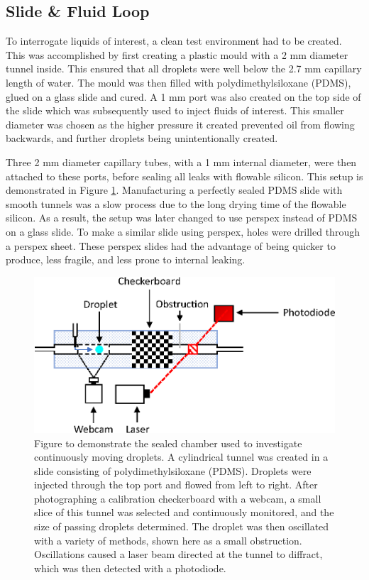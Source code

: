 \documentclass{physics_article_B}
\begin{document}
    \subsection{Slide \& Fluid Loop\label{sect:method:slide}}
    
        To interrogate liquids of interest, a clean test environment had to be created. This was accomplished by first creating a plastic mould with a 2 mm diameter tunnel inside. This ensured that all droplets were well below the 2.7 mm capillary length of water\cite{capillary}. The mould was then filled with polydimethylsiloxane (PDMS), glued on a glass slide and cured. A 1 mm port was also created on the top side of the slide which was subsequently used to inject fluids of interest. This smaller diameter was chosen as the higher pressure it created prevented oil from flowing backwards, and further droplets being unintentionally created.
        
        Three 2 mm diameter capillary tubes, with a 1 mm internal diameter, were then attached to these ports, before sealing all leaks with flowable silicon. This setup is demonstrated in Figure \ref{fig:slide}. Manufacturing a perfectly sealed PDMS slide with smooth tunnels was a slow process due to the long drying time of the flowable silicon. As a result, the setup was later changed to use perspex instead of PDMS on a glass slide. To make a similar slide using perspex, holes were drilled through a perspex sheet. These perspex slides had the advantage of being quicker to produce, less fragile, and less prone to internal leaking. 
        
            \begin{figure}[H]
                \centering
                    \hspace*{2.4cm}\includegraphics[scale=0.9]{Figures/Control.eps}
                    \caption{Figure to demonstrate the sealed chamber used to investigate continuously moving droplets. A cylindrical tunnel was created in a slide consisting of polydimethylsiloxane (PDMS). Droplets were injected through the top port and flowed from left to right. After photographing a calibration checkerboard with a webcam, a small slice of this tunnel was selected and continuously monitored, and the size of passing droplets determined. The droplet was then oscillated with a variety of methods, shown here as a small obstruction. Oscillations caused a laser beam directed at the tunnel to diffract, which was then detected with a photodiode.} 
                \label{fig:slide}
            \end{figure} 
    
\end{document}
